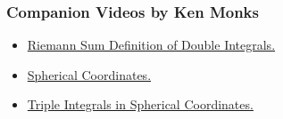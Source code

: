 \subsubsection*{Companion Videos by Ken Monks}
\begin{itemize}
\item \href{https://www.youtube.com/watch?v=ga7g3kuoGBY}{Riemann Sum Definition of Double Integrals.}
\item \href{https://www.youtube.com/watch?v=14pepJeFyAQ}{Spherical Coordinates.}
\item \href{https://www.youtube.com/watch?v=6b6TWV9rFZM}{Triple Integrals in Spherical Coordinates.}
\end{itemize}

\renewcommand\thesubsection{\thesection.\arabic{subsection}}